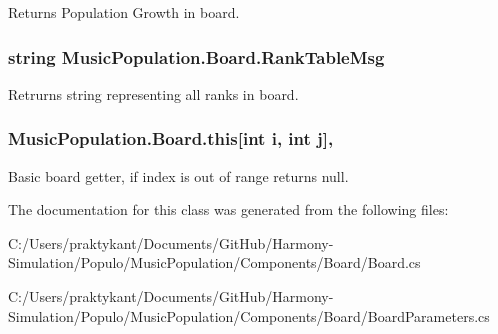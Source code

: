 Returns Population Growth in board. 

\hypertarget{class_music_population_1_1_board_af0fe9cecfaf3577bf9ea697c4e909e96}{
\subsubsection[{Rank\+Table\+Msg}]{\setlength{\rightskip}{0pt plus 5cm}string Music\+Population.\+Board.\+Rank\+Table\+Msg\hspace{0.3cm}{\ttfamily [get]}}}\label{class_music_population_1_1_board_af0fe9cecfaf3577bf9ea697c4e909e96}


Retrurns string representing all ranks in board. 

\hypertarget{class_music_population_1_1_board_abd14bb128680a5f37fc29f006e65e4f0}{
\subsubsection[{this[int i, int j]}]{ Music\+Population.\+Board.\+this\mbox{[}int i, int j\mbox{]}\hspace{0.3cm}{\ttfamily [get]}, {\ttfamily [set]}}}\label{class_music_population_1_1_board_abd14bb128680a5f37fc29f006e65e4f0}


Basic board getter, if index is out of range returns null. 



The documentation for this class was generated from the following files\+:\begin{DoxyCompactItemize}
\item 
C\+:/\+Users/praktykant/\+Documents/\+Git\+Hub/\+Harmony-\/\+Simulation/\+Populo/\+Music\+Population/\+Components/\+Board/Board.\+cs\item 
C\+:/\+Users/praktykant/\+Documents/\+Git\+Hub/\+Harmony-\/\+Simulation/\+Populo/\+Music\+Population/\+Components/\+Board/Board\+Parameters.\+cs\end{DoxyCompactItemize}
